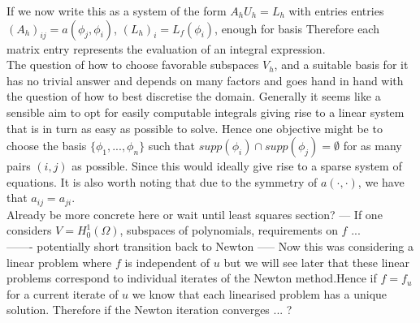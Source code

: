 \documentclass[fleqn, a4paper, 11pt, bibliography=totoc]{report}
\begin{document}
If we now write this as a system of the form $A_h U_h = L_h$ with entries entries $(A_h)_{ij} = a(\phi_j, \phi_i)$, $(L_h)_i = L_f(\phi_i)$, 
enough for basis
Therefore each matrix entry represents the evaluation of an integral expression. 
\bigskip
\\
The question of how to choose favorable subspaces $V_h$, and a suitable basis for it has no trivial answer and depends on many factors and goes hand in hand with the question of how to best discretise the domain. Generally it seems like a sensible aim to opt for easily computable integrals giving rise to a linear system that is in turn as easy as possible to solve. Hence one objective might be to choose the basis $\{\phi_1, ..., \phi_n \}$ such that $supp(\phi_i) \cap supp(\phi_j) = \emptyset$ for as many pairs $(i,j)$ as possible. Since this would ideally give rise to a sparse system of equations. It is also worth noting that due to the symmetry of $a(\cdot, \cdot)$, we have that $a_{ij} = a_{ji}$. 
\bigskip
\\
Already be more concrete here or wait until least squares section? ---
If one considers $V = H_0^1(\Omega)$, subspaces of polynomials, requirements on $f$ ... 
\bigskip
\\
------- potentially short transition back to Newton ----- 
Now this was considering a linear problem where $f$ is independent of $u$ but we will see later that these linear problems correspond to individual iterates of the Newton method.Hence if $ f = f_u$ for a current iterate of $u$ we know that each linearised problem has a unique solution. Therefore if the Newton iteration converges ... ?
\end{document}
